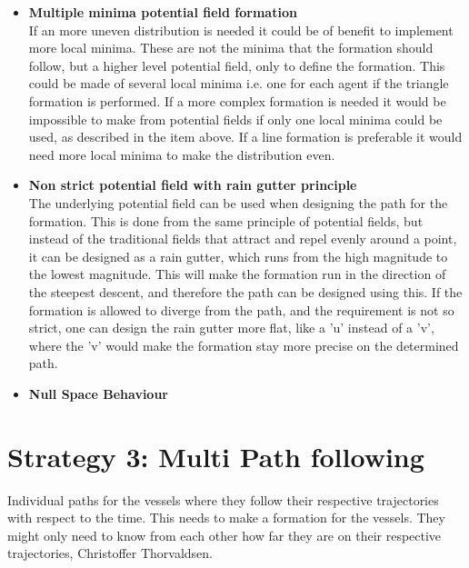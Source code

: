 \begin{itemize}
\item \textbf{Multiple minima potential field formation}\\
If an more uneven distribution is needed it could be of benefit to implement more local minima. These are not the minima that the formation should follow, but a higher level potential field, only to define the formation. This could be made of several local minima i.e. one for each agent if the triangle formation is performed. If a more complex formation is needed it would be impossible to make from potential fields if only one local minima could be used, as described in the item above. If a line formation is preferable it would need more local minima to make the distribution even.
\item \textbf{Non strict potential field with rain gutter principle}\\
The underlying potential field can be used when designing the path for the formation. This is done from the same principle of potential fields, but instead of the traditional fields that attract and repel evenly around a point, it can be designed as a rain gutter, which runs from the high magnitude to the lowest magnitude. This will make the formation run in the direction of the steepest descent, and therefore the path can be designed using this. If the formation is allowed to diverge from the path, and the requirement is not so strict, one can design the rain gutter more flat, like a 'u' instead of a 'v', where the 'v' would make the formation stay more precise on the determined path.
\item \textbf{Null Space Behaviour}

\end{itemize}





\section{Strategy 3: Multi Path following}
Individual paths for the vessels where they follow their respective trajectories with respect to the time. This needs to make a formation for the vessels. They might only need to know from each other how far they are on their respective trajectories, Christoffer Thorvaldsen.



